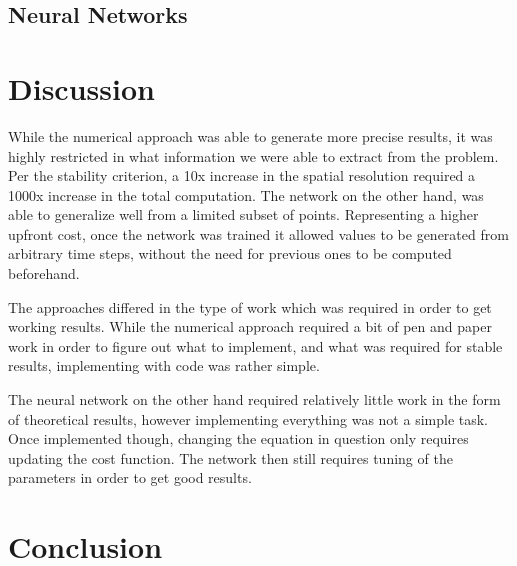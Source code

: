 \documentclass{article}
\theoremstyle{definition}
\begin{document}
\subsection{Neural Networks}


\section{Discussion}
While the numerical approach was able to generate more precise results, it was highly restricted in what information we were able to extract from the problem. Per the stability criterion, a 10x increase in the spatial resolution required a 1000x increase in the total computation. The network on the other hand, was able to generalize well from a limited subset of points. Representing a higher upfront cost, once the network was trained it allowed values to be generated from arbitrary time steps, without the need for previous ones to be computed beforehand.

The approaches differed in the type of work which was required in order to get working results. While the numerical approach required a bit of pen and paper work in order to figure out what to implement, and what was required for stable results, implementing with code was rather simple.

The neural network on the other hand required relatively little work in the form of theoretical results, however implementing everything was not a simple task. Once implemented though, changing the equation in question only requires updating the cost function. The network then still requires tuning of the parameters in order to get good results.




\section{Conclusion}

\printbibliography
\end{document}
